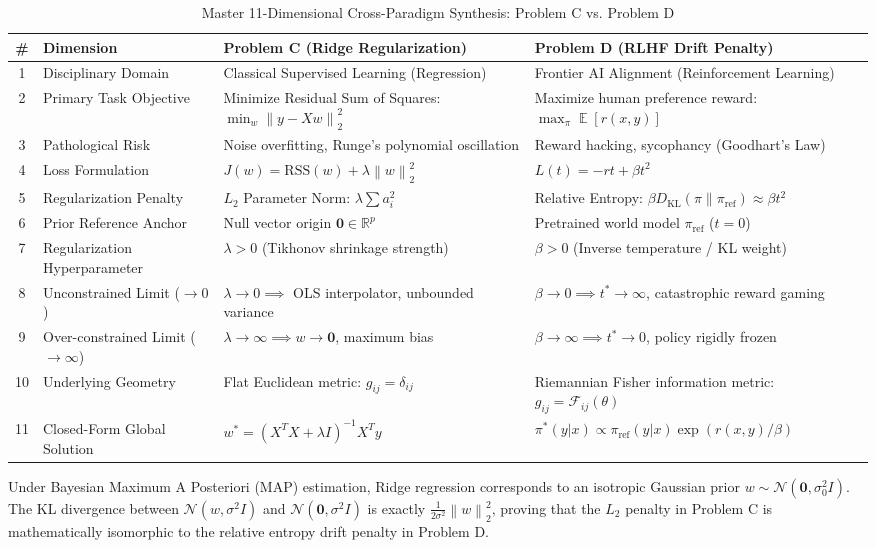 \documentclass[11pt,a4paper]{article}
\theoremstyle{definition}
\theoremstyle{plain}
\theoremstyle{remark}
\DeclareMathOperator{\E}{\mathbb{E}}
\newcommand{\norm}[1]{\left\lVert#1\right\rVert}
\newcommand{\R}{\mathbb{R}}
\newcommand{\KL}[2]{D_{\mathrm{KL}}\left(#1 \parallel #2\right)}
\begin{document}
\begin{table}[htbp]
\centering
\small
\caption{Master 11-Dimensional Cross-Paradigm Synthesis: Problem C vs. Problem D}
\label{tab:cross_analysis_master}
\begin{tabularx}{\textwidth}{c l X X}
\toprule
\textbf{\#} & \textbf{Dimension} & \textbf{Problem C (Ridge Regularization)} & \textbf{Problem D (RLHF Drift Penalty)} \\
\midrule
1 & Disciplinary Domain & Classical Supervised Learning (Regression) & Frontier AI Alignment (Reinforcement Learning) \\
2 & Primary Task Objective & Minimize Residual Sum of Squares: $\min_w \norm{y - Xw}_2^2$ & Maximize human preference reward: $\max_\pi \E[r(x,y)]$ \\
3 & Pathological Risk & Noise overfitting, Runge's polynomial oscillation & Reward hacking, sycophancy (Goodhart's Law) \\
4 & Loss Formulation & $J(w) = \text{RSS}(w) + \lambda \norm{w}_2^2$ & $L(t) = -rt + \beta t^2$ \\
5 & Regularization Penalty & $L_2$ Parameter Norm: $\lambda \sum a_i^2$ & Relative Entropy: $\beta \KL{\pi}{\pi_{\text{ref}}} \approx \beta t^2$ \\
6 & Prior Reference Anchor & Null vector origin $\mathbf{0} \in \R^p$ & Pretrained world model $\pi_{\text{ref}}$ ($t=0$) \\
7 & Regularization Hyperparameter & $\lambda > 0$ (Tikhonov shrinkage strength) & $\beta > 0$ (Inverse temperature / KL weight) \\
8 & Unconstrained Limit ($\to 0$) & $\lambda \to 0 \implies$ OLS interpolator, unbounded variance & $\beta \to 0 \implies t^* \to \infty$, catastrophic reward gaming \\
9 & Over-constrained Limit ($\to \infty$) & $\lambda \to \infty \implies w \to \mathbf{0}$, maximum bias & $\beta \to \infty \implies t^* \to 0$, policy rigidly frozen \\
10 & Underlying Geometry & Flat Euclidean metric: $g_{ij} = \delta_{ij}$ & Riemannian Fisher information metric: $g_{ij} = \mathcal{F}_{ij}(\theta)$ \\
11 & Closed-Form Global Solution & $w^* = (X^T X + \lambda I)^{-1} X^T y$ & $\pi^*(y|x) \propto \pi_{\text{ref}}(y|x) \exp(r(x,y)/\beta)$ \\
\bottomrule
\end{tabularx}
\end{table}

Under Bayesian Maximum A Posteriori (MAP) estimation, Ridge regression corresponds to an isotropic Gaussian prior $w \sim \mathcal{N}(\mathbf{0}, \sigma_0^2 I)$. The KL divergence between $\mathcal{N}(w, \sigma^2 I)$ and $\mathcal{N}(\mathbf{0}, \sigma^2 I)$ is exactly $\frac{1}{2\sigma^2}\norm{w}_2^2$, proving that the $L_2$ penalty in Problem C is mathematically isomorphic to the relative entropy drift penalty in Problem D.

\newpage


\end{document}
